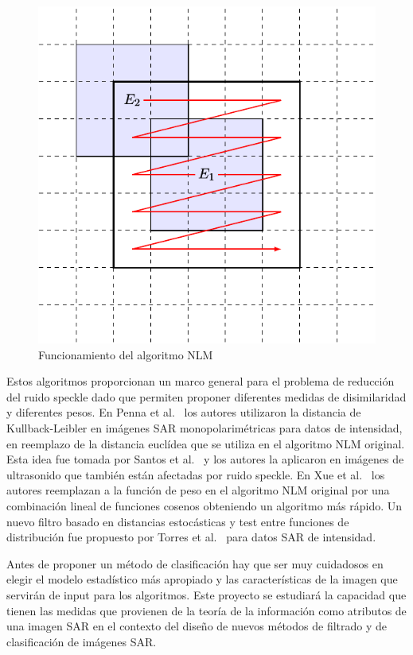 \documentclass[12pt]{article}
\begin{document}
\begin{figure}[hbt]
	\label{NLM}
	\centering
	\includegraphics[scale=0.6]{../../Figures/Proyectos/UNGS2020/filtros.pdf}
	\caption{Funcionamiento del algoritmo NLM}
\end{figure}

Estos algoritmos proporcionan un marco general para el problema de reducción del ruido speckle dado que permiten proponer diferentes medidas de disimilaridad y diferentes pesos. En Penna et al.~\cite{Penna2013} los autores utilizaron la distancia de Kullback-Leibler en imágenes SAR monopolarimétricas para datos de intensidad, en reemplazo de la distancia euclídea que se utiliza en el algoritmo NLM original. Esta idea fue tomada por Santos et al.~\cite{Santos2017} y los autores la aplicaron en imágenes de ultrasonido que también están afectadas por ruido speckle. En Xue et al.~\cite{Xue2013} los autores reemplazan a la función de peso en el algoritmo NLM original por una combinación lineal de funciones cosenos obteniendo un algoritmo más rápido. Un nuevo filtro basado en distancias estocásticas y test entre funciones de distribución fue propuesto por Torres et al.~\cite{Torres2012} para datos SAR de intensidad.

Antes de proponer un método de clasificación hay que ser muy cuidadosos en elegir el modelo estadístico más apropiado y las características de la imagen que servirán de input para los algoritmos. Este proyecto se estudiará la capacidad que tienen las medidas que provienen de la teoría de la información como atributos de una imagen SAR en el contexto del diseño de nuevos métodos de filtrado y de clasificación de imágenes SAR.
\end{document}
